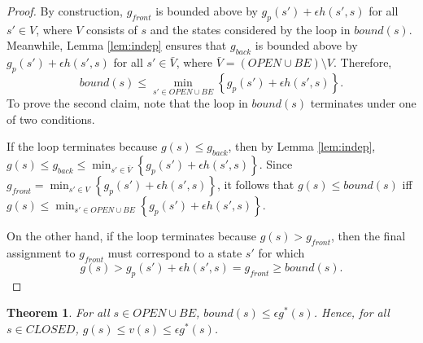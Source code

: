 \documentclass[letterpaper]{article}
\newtheorem{thm}{Theorem}
\begin{document}
\begin{proof}
By construction, $g_{front}$ is bounded above by $g_p(s') + \epsilon h(s',s)$ for all $s'\in V$, where $V$ consists of $s$ and the states considered by the loop in $bound(s)$. Meanwhile, Lemma \ref{lem:indep} ensures that $g_{back}$ is bounded above by $g_p(s') + \epsilon h(s',s)$ for all $s'\in \bar V$, where $\bar V = (OPEN \cup BE) \setminus V$. Therefore,
\[bound(s) \le \min_{s' \in OPEN \cup BE} \left\{g_p(s') + \epsilon h(s',s)\right\}.\]
To prove the second claim, note that the loop in $bound(s)$ terminates under one of two conditions.

If the loop terminates because $g(s) \le g_{back}$, then by Lemma \ref{lem:indep}, $g(s) \le g_{back} \le \min_{s'\in \bar V} \left\{ g_p(s') + \epsilon h(s',s) \right\}$. Since $g_{front} = \min_{s'\in V} \left\{ g_p(s') + \epsilon h(s',s) \right\}$, it follows that $g(s) \le bound(s)$ iff $g(s) \le \min_{s'\in OPEN \cup BE} \left\{ g_p(s') + \epsilon h(s',s) \right\}$.

On the other hand, if the loop terminates because $g(s) > g_{front}$, then the final assignment to $g_{front}$ must correspond to a state $s'$ for which
\[g(s) > g_p(s') + \epsilon h(s',s) = g_{front} \ge bound(s).\]
\end{proof}

\begin{thm}
\label{thm:subopt}
For all $s\in OPEN\cup BE$, $bound(s) \le \epsilon g^*(s)$. Hence, for all $s\in CLOSED$, $g(s) \le v(s) \le \epsilon g^*(s)$.
\end{thm}
\end{document}
